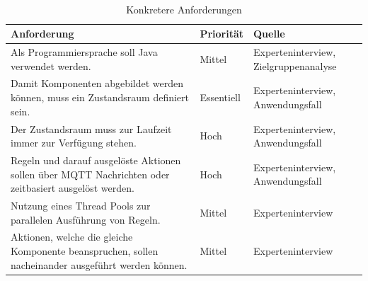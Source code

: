     \\
    \begin{table}[hbt!]
        \begin{center}
            \begin{tabular}{| p{10.4cm} | p{1.8cm} | p{3.2cm} | }
                \hline
                   \textbf{Anforderung} & \textbf{Priorität} & \textbf{Quelle} \\
                \hline
                    Als Programmiersprache soll Java verwendet werden. & Mittel & Experteninterview, Zielgruppenanalyse \\ 
                \hline
                    Damit Komponenten abgebildet werden können, muss ein Zustandsraum definiert sein. & Essentiell & Experteninterview, Anwendungsfall \\ 
                \hline
                    Der Zustandsraum muss zur Laufzeit immer zur Verfügung stehen. & Hoch & Experteninterview, Anwendungsfall \\ 
                \hline
                    Regeln und darauf ausgelöste Aktionen sollen über MQTT Nachrichten oder zeitbasiert ausgelöst werden. & Hoch & Experteninterview, Anwendungsfall \\
                \hline
                    Nutzung eines Thread Pools zur parallelen Ausführung von Regeln. & Mittel & Experteninterview \\ 
                \hline
                    Aktionen, welche die gleiche Komponente beanspruchen, sollen nacheinander ausgeführt werden können. & Mittel & Experteninterview \\
                \hline
            \end{tabular}
        \end{center}
        \caption{Konkretere Anforderungen}
        \label{tab:concretRequirements}
    \end{table}
    \\
